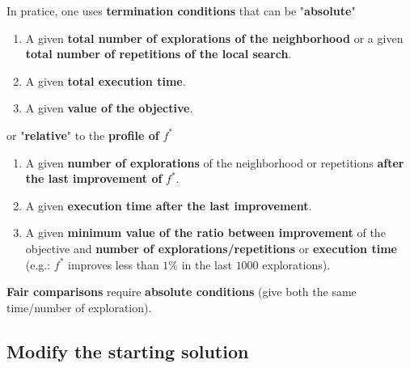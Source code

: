 \documentclass[11pt]{article}
\begin{document}
	In pratice, one uses \textbf{termination conditions} that can be "\textbf{absolute}"
	\begin{enumerate}
		\item A given \textbf{total number of explorations of the neighborhood} or a given \textbf{total number of repetitions of the local search}.\\
		
		\item A given \textbf{total execution time}.\\
		
		\item A given \textbf{value of the objective}.\\
	\end{enumerate}
	
	or "\textbf{relative}" to the \textbf{profile of} $f^\ast$
	\begin{enumerate}
		\item A given \textbf{number of explorations} of the neighborhood or repetitions \textbf{after the last improvement of} $f^\ast$.\\
		
		\item A given \textbf{execution time after the last improvement}.\\
		
		\item A given \textbf{minimum value of the ratio between improvement} of the objective and \textbf{number of explorations/repetitions} or \textbf{execution time} (e.g.: $f^\ast$ improves less than $1\%$ in the last $1000$ explorations).\\
	\end{enumerate}
	
	\textbf{Fair comparisons} require \textbf{absolute conditions} (give both the same time/number of exploration).\\
	
	\newpage
	
	\subsection{Modify the starting solution}
	
\end{document}
